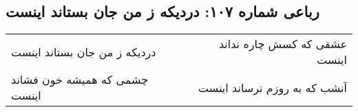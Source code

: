 \begin{center}
\section*{رباعی شماره ۱۰۷: دردیکه ز من جان بستاند اینست}
\label{sec:sh107}
\begin{longtable}{l p{0.5cm} r}
دردیکه ز من جان بستاند اینست
&&
عشقی که کسش چاره نداند اینست
\\
چشمی که همیشه خون فشاند اینست
&&
آنشب که به روزم نرساند اینست
\\
\end{longtable}
\end{center}
